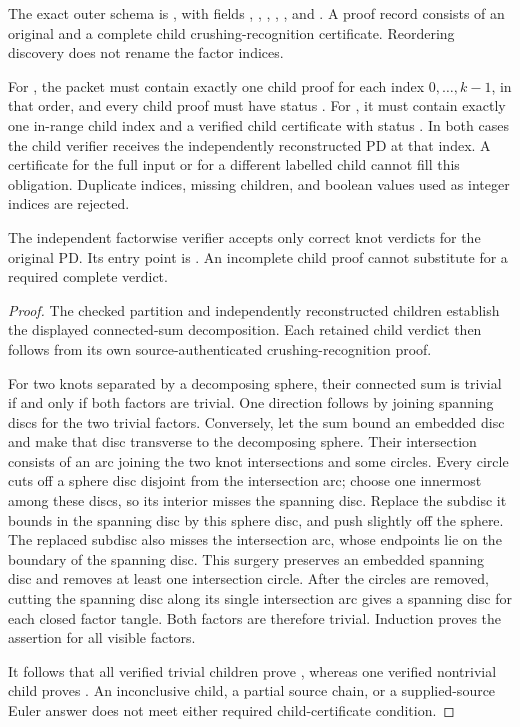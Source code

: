 The exact outer schema is , with fields
, , , ,
, and .  A proof record consists of an
original  and a complete child crushing-recognition
certificate.  Reordering discovery does not rename the factor indices.

For , the packet must contain exactly one child proof for
each index $0,\ldots,k-1$, in that order, and every child proof must have
status .  For , it must contain exactly one
in-range child index and a verified child certificate with status
.  In both cases the child verifier receives the independently
reconstructed PD at that index.  A certificate for the full input or for
a different labelled child cannot fill this obligation.  Duplicate indices,
missing children, and boolean values used as integer indices are rejected.

\begin{proposition}
\label{prop:factored-crushing-soundness}
The independent factorwise verifier accepts only correct knot verdicts
for the original PD.  Its entry point is
.
An incomplete child proof cannot substitute for a required complete verdict.
\end{proposition}
\begin{proof}
The checked partition and independently reconstructed children establish
the displayed connected-sum decomposition.  Each retained child verdict
then follows from its own source-authenticated crushing-recognition proof.

For two knots separated by a decomposing sphere, their connected sum is
trivial if and only if both factors are trivial.  One direction follows
by joining spanning discs for the two trivial factors.  Conversely, let
the sum bound an embedded disc and make that disc transverse to the
decomposing sphere.  Their intersection consists of an arc joining the
two knot intersections and some circles.  Every circle cuts off a sphere
disc disjoint from the intersection arc; choose one innermost among these
discs, so its interior misses the spanning disc.  Replace the subdisc it
bounds in the spanning disc by this sphere disc, and push slightly off
the sphere.  The replaced subdisc also misses the intersection arc, whose
endpoints lie on the boundary of the spanning disc.  This surgery preserves
an embedded spanning disc and removes at least one intersection circle.
After the circles are removed, cutting the spanning disc along its single
intersection arc gives a spanning disc for each closed factor tangle.
Both factors are therefore trivial.  Induction proves the assertion for
all visible factors.

It follows that all verified trivial children prove , whereas
one verified nontrivial child proves .  An inconclusive child,
a partial  source chain, or a supplied-source Euler answer
does not meet either required child-certificate condition.
\end{proof}

